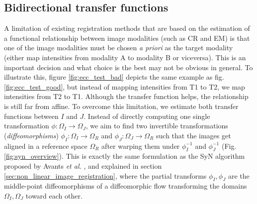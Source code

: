 \subsection{Bidirectional transfer functions}

A limitation of existing registration methods that are based on the estimation of a functional relationship between image modalities (such as CR and EM\cite{Roche1998, Roche2000, Arce-santana2014}) is that one of the image modalities must be chosen \emph{a priori} as the target modality (either map intensities from modality A to modality B or viceversa). This is an important decision and what choice is the best may not be obvious in general. To illustrate this, figure \ref{fig:ecc_test_bad} depicts the same example as fig. \ref{fig:ecc_test_good}, but instead of mapping intensities from T1 to T2, we map intensities from T2 to T1. Although the transfer function helps, the relationship is still far from affine. To overcome this limitation, we estimate both transfer functions between $I$ and $J$. Instead of directly computing one single transformation $\phi:\Omega_{I} \rightarrow \Omega_{J}$, we aim to find two invertible transformations (\emph{diffeomorphisms}) $\phi_{I}:\Omega_{I}\rightarrow \Omega_{R}$ and $\phi_{J}:\Omega_{J}\rightarrow \Omega_{R}$ such that the images get aligned in a reference space $\Omega_{R}$ after warping them under $\phi_{I}^{-1}$ and $\phi_{J}^{-1}$ (Fig. \ref{fig:syn_overview}). This is exactly the same formulation as the SyN algorithm proposed by Avants {\it et al.} \cite{Avants2011}, and explained in section \ref{sec:non_linear_image_registration}, where the partial transforms $\phi_{I}, \phi_{J}$ are the middle-point diffeomorphisms of a diffeomorphic flow transforming the domains $\Omega_{I}, \Omega_{J}$ toward each other.\\

